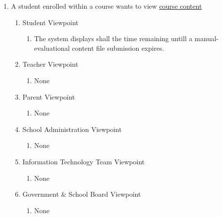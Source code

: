 \documentclass[]{article}
\begin{document}
\begin{enumerate}[{BE}1.]
	\item A student enrolled within a course wants to view \underline{course
content}
	\begin{enumerate}[{VP2}.1]
		\item Student Viewpoint
			\begin{enumerate}
				\item The system displays shall the time remaining untill a
manual-evaluational
content file submission expires.
			\end{enumerate}
		\item Teacher Viewpoint
			\begin{enumerate}
				\item None
			\end{enumerate}
		\item Parent Viewpoint
			\begin{enumerate}
				\item None
			\end{enumerate}
		\item School Administration Viewpoint
			\begin{enumerate}
				\item None
			\end{enumerate}
		\item Information Technology Team Viewpoint
			\begin{enumerate}
				\item None
			\end{enumerate}
		\item Government \& School Board Viewpoint
			\begin{enumerate}
				\item None
			\end{enumerate}
	\end{enumerate}



\end{enumerate}
\end{document}
